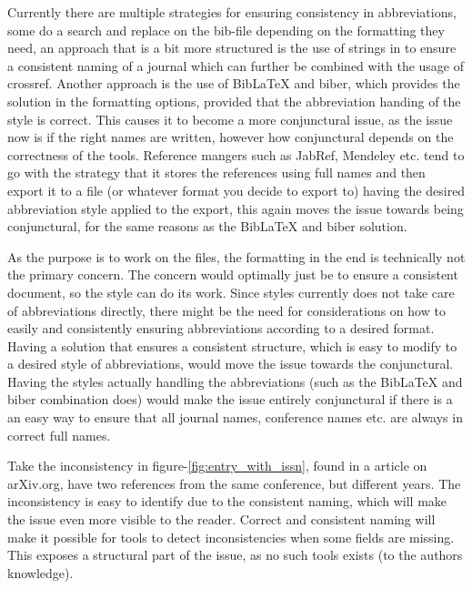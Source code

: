 Currently there are multiple strategies for ensuring consistency in
abbreviations, some do a search and replace on the bib-file depending
on the formatting they need, an approach that is a bit more structured
is the use of strings in {\bibtex} to ensure a consistent naming of a
journal which can further be combined with the usage of crossref.
Another approach is the use of Bib{\LaTeX} and biber, which provides
the solution in the formatting
options\cite{koppensteiner2011abbreviate}, provided that the
abbreviation handing of the style is correct.  This causes it to
become a more conjunctural issue, as the issue now is if the right
names are written, however how conjunctural depends on the correctness
of the tools.  Reference mangers such as JabRef, Mendeley etc. tend to
go with the strategy that it stores the references using full names
and then export it to a {\bibtex} file (or whatever format you decide
to export to) having the desired abbreviation style applied to the
export, this again moves the issue towards being conjunctural, for the
same reasons as the Bib{\LaTeX} and biber solution.

As the purpose is to work on the {\bibtex} files, the formatting in
the end is technically not the primary concern.  The concern would
optimally just be to ensure a consistent document, so the style can do
its work.  Since {\bibtex} styles currently does not take care of
abbreviations directly, there might be the need for considerations on
how to easily and consistently ensuring abbreviations according to a
desired format.  Having a solution that ensures a consistent
structure, which is easy to modify to a desired style of
abbreviations, would move the issue towards the conjunctural.  Having
the styles actually handling the abbreviations (such as the
Bib{\LaTeX} and biber combination does) would make the issue entirely
conjunctural if there is a an easy way to ensure that all journal
names, conference names etc. are always in correct full names.


Take the inconsistency in figure-\ref{fig:entry_with_issn}, found in a
article on arXiv.org, have two references from the same conference,
but different years.  The inconsistency is easy to identify due to the
consistent naming, which will make the issue even more visible to the
reader.  Correct and consistent naming will make it possible for tools
to detect inconsistencies when some fields are missing.  This exposes
a structural part of the issue, as no such tools exists (to the
authors knowledge).

